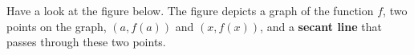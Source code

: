 \documentclass{ximera}
\begin{document}
Have a look at the figure below.
The figure depicts a graph of the function $f$, two points on the graph, $(a,f(a))$ and $(x,f(x))$, and a \textbf{secant line} 
that passes  through these two points.
\begin{comment}
	\begin{image}\begin{tikzpicture}
	          \begin{axis}[
	            clip=false, domain=0:2.5, axis lines =middle, xlabel=$x$,
	            ylabel=$y$, every axis y label/.style={at=(current
	              axis.above origin),anchor=south}, 
	             width=4in,
	          ticks=none ]   
	                             \addplot [thick, penColor,smooth] {(x-1)^2 };
	      
	     
	                     
	           \node at (axis cs:0,-0.1) {$0$};
	        
	           
	               \addplot[only marks,very thick,penColor,mark=*]
		        coordinates{(1.65,0.43)};
		        \addplot[only marks,very thick,penColor,mark=*]
		        coordinates{(2,1)};
	            
	                \addplot [ thick,penColor3]  plot coordinates {(1.394,0) (2.5,1.825)};
	           
		        \addplot[only marks,very thick,penColor,mark=*]
		        coordinates{(2,1)};
	               
	      \addplot[only marks,penColor,mark=*]
		        coordinates{(2,0)};
	            \addplot[only marks,penColor,mark=*]
		        coordinates{(1.65,0)};
	
	               \node at (axis cs:1.65,-0.1) {$a$ };
	                \node at (axis cs:1.2,1.8) {slope of the secant line $=\frac{\Delta y}{\Delta x}=\frac{f(x)-f(a)}{x-a}$ };
	               \node at (axis cs:2,-0.1) {$x$ };
	                 \node at (axis cs:2.3,1) {$(x,f(x))$ };
	                  \node at (axis cs:1.4,0.45) {$(a,f(a))$ };
	                   \node at (axis cs:2.6,1.5) { secant line  };
	        \end{axis}
	\end{tikzpicture}\end{image}
\end{comment}
\end{document}
